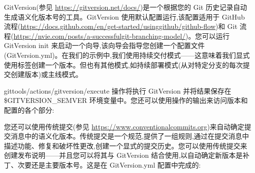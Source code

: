 

GitVersion(参见 \url{https://gitversion.net/docs/})是一个根据您的 Git 历史记录自动生成语义化版本号的工具。GitVersion 使用默认配置运行,该配置适用于 GitHub 流程(\url{https://docs.github.com/en/get-started/usinggithub/github-flow})和 Git 流程(\url{https://nvie.com/posts/a-successfulgit-branching-model/})。您可以运行 GitVersion init 来启动一个向导,该向导会指导您创建一个配置文件(GitVersion.yml)。在我们的示例中,我们使用持续交付模式——这意味着我们显式使用标签创建一个版本。但也有其他模式,如持续部署模式(从对特定分支的每次提交创建版本)或主线模式。

gittools/actions/gitversion/execute 操作将执行 GitVersion 并将结果保存在 \$GITVERSION\_SEMVER 环境变量中。您还可以使用操作的输出来访问版本和配置的各个部分:



您还可以使用传统提交(参见 \url{https://www.conventionalcommits.org})来自动确定提交消息中的语义化版本。传统提交是一个规范,提供了一组规则,通过在提交消息中描述功能、修复和破坏性更改,创建一个显式的提交历史。您可以使用传统提交来创建发布说明——并且您可以将其与 GitVersion 结合使用,以自动确定新版本是补丁、次要还是主要版本号。这是在 GitVersion.yml 配置中完成的:

